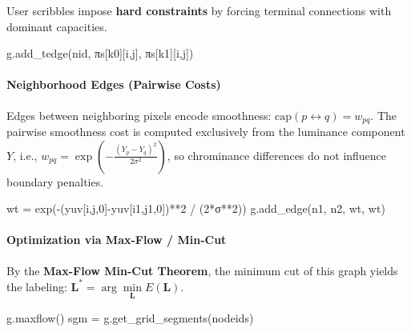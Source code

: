 \documentclass[11pt]{article}
\newenvironment{Shaded}{}{}
\newcommand{\DecValTok}[1]{\textcolor[rgb]{0.25,0.63,0.44}{{#1}}}
\newcommand{\NormalTok}[1]{{#1}}
\newcommand{\OperatorTok}[1]{\textcolor[rgb]{0.40,0.40,0.40}{{#1}}}
\begin{document}
User scribbles impose \textbf{hard constraints} by forcing terminal
connections with dominant capacities.

\begin{Shaded}
\begin{Highlighting}[]
\NormalTok{g.add\_tedge(nid, πs[k0][i,j], πs[k1][i,j])}
\end{Highlighting}
\end{Shaded}

\hypertarget{neighborhood-edges-pairwise-costs}{%
\paragraph{\texorpdfstring{\textbf{Neighborhood Edges (Pairwise
Costs)}}{Neighborhood Edges (Pairwise Costs)}}\label{neighborhood-edges-pairwise-costs}}

Edges between neighboring pixels encode smoothness:
\(\text{cap}(p \leftrightarrow q) = w_{pq}\). The pairwise smoothness
cost is computed exclusively from the luminance component \(Y\), i.e.,
\(w_{pq} = \exp\left(-\frac{(Y_p - Y_q)^2}{2\sigma^2}\right)\), so
chrominance differences do not influence boundary penalties.

\begin{Shaded}
\begin{Highlighting}[]
\NormalTok{wt }\OperatorTok{=}\NormalTok{ exp(}\OperatorTok{{-}}\NormalTok{(yuv[i,j,}\DecValTok{0}\NormalTok{]}\OperatorTok{{-}}\NormalTok{yuv[i1,j1,}\DecValTok{0}\NormalTok{])}\OperatorTok{**}\DecValTok{2} \OperatorTok{/}\NormalTok{ (}\DecValTok{2}\OperatorTok{*}\NormalTok{σ}\OperatorTok{**}\DecValTok{2}\NormalTok{))}
\NormalTok{g.add\_edge(n1, n2, wt, wt)}
\end{Highlighting}
\end{Shaded}

\hypertarget{optimization-via-max-flow-min-cut}{%
\paragraph{\texorpdfstring{\textbf{Optimization via Max-Flow /
Min-Cut}}{Optimization via Max-Flow / Min-Cut}}\label{optimization-via-max-flow-min-cut}}

By the \textbf{Max-Flow Min-Cut Theorem}, the minimum cut of this graph
yields the labeling:
\(\mathbf{L}^* = \arg\underset{\mathbf{L}}{\min} E(\mathbf{L})\).

\begin{Shaded}
\begin{Highlighting}[]
\NormalTok{g.maxflow()}
\NormalTok{sgm }\OperatorTok{=}\NormalTok{ g.get\_grid\_segments(nodeids)}
\end{Highlighting}
\end{Shaded}
\end{document}
